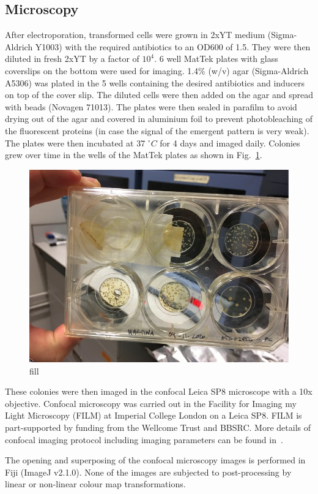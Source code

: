 \subsection{Microscopy}\label{microscopy}
After electroporation, transformed cells were grown in 2xYT medium (Sigma-Aldrich Y1003) with the required antibiotics to an OD600 of 1.5. They were then diluted in fresh 2xYT by a factor of $10^4$.
6 well MatTek plates with glass coverslips on the bottom were used for imaging.
1.4\% (w/v) agar (Sigma-Aldrich A5306) was plated in the 5 wells containing the desired antibiotics and inducers on top of the cover slip.
The diluted cells were then added on the agar and spread with beads (Novagen 71013).
The plates were then sealed in parafilm to avoid drying out of the agar and covered in aluminium foil to prevent photobleaching of the fluorescent proteins (in case the signal of the emergent pattern is very weak).
The plates were then incubated at 37 $^{\circ} C$ for 4 days and imaged daily.
Colonies grew over time in the wells of the MatTek plates as shown in Fig.~\ref{matek}.

\begin{figure}[H]

    \includegraphics[width=1\textwidth]{chapters/Methods/matek}
    \caption{fill}
    \label{matek}
\end{figure}

These colonies were then imaged in the confocal Leica SP8 microscope with a 10x objective.
Confocal microscopy was carried out in the Facility for Imaging my Light Microscopy (FILM) at Imperial College London on a Leica SP8.
FILM is part-supported by funding from the Wellcome Trust and BBSRC.
More details of confocal imaging protocol including imaging parameters can be found in~\parencite{Tica2020}.

The opening and superposing of the confocal microscopy images is performed in Fiji (ImageJ v2.1.0).
None of the images are subjected to post-processing by linear or non-linear colour map transformations.

